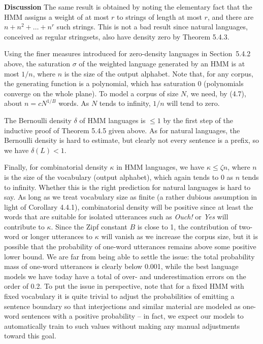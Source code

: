 \smallskip
\noindent
{\bf Discussion} The same result is obtained by noting the elementary fact
that the HMM assigns a weight of at most $r$ to strings of length at most $r$,
and there are $n+n^2+\ldots+n^r$ such strings. This is not a bad result
since natural languages, conceived as regular stringsets, also have
density zero by Theorem 5.4.3.

Using the finer measures introduced for zero-density languages in
Section~5.4.2 above, the saturation $\sigma$ of the weighted language
generated by an HMM is at most $1/n$, where $n$ is the size of the output
alphabet. Note that, for any corpus, the generating function is a polynomial,
which has saturation 0 (polynomials converge on the whole plane). To model a
corpus of size $N$, we need, by (4.7), about $n=cN^{1/B}$ words. As $N$ tends
to infinity, $1/n$ will tend to zero.

The Bernoulli density $\delta$ of HMM languages is $\leq 1$ by the first step
of the inductive proof of Theorem 5.4.5 given above. As for natural languages,
the Bernoulli density is hard to estimate, but clearly not every sentence is a
prefix, so we have $\delta(L) < 1$.

Finally, for combinatorial density $\kappa$ in HMM languages, we have $\kappa
\leq \zeta{n}$, where $n$ is the size of the vocabulary (output alphabet),
which again tends to 0 as $n$ tends to infinity. Whether this is the right
prediction for natural languages is hard to say. As long as we treat
vocabulary size as finite (a rather dubious assumption in light of Corollary
4.4.1), combinatorial density will be positive since at least the words that
are suitable for isolated utterances such as {\it Ouch!}  or {\it Yes} will
contribute to $\kappa$. Since the Zipf constant $B$ is close to 1, the
contribution of two-word or longer utterances to $\kappa$ will vanish as we
increase the corpus size, but it is possible that the probability of one-word
utterances remains above some positive lower bound. We are far from being able
to settle the issue: the total probability mass of one-word utterances is
clearly below 0.001, while the best language models we have today have a total
of over- and underestimation errors on the order of 0.2. To put the issue in
perspective, note that for a fixed HMM with fixed vocabulary it is quite
trivial to adjust the probabilities of emitting a sentence boundary so that
interjections and similar material are modeled as one-word sentences with a
positive probability -- in fact, we expect our models to automatically train to
such values without making any manual adjustments toward this goal.


